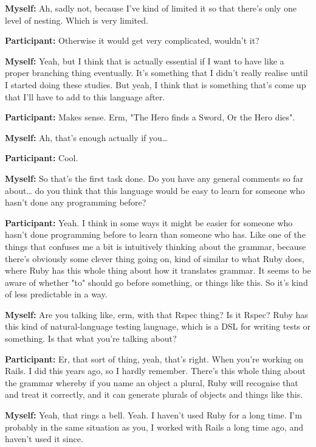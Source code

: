 \documentclass[11pt]{report}
\begin{document}
\begin{linenumbers}
\textbf{Myself:} Ah, sadly not, because I've kind of limited it so that there's only one level of nesting. Which is very limited.

\textbf{Participant:} Otherwise it would get very complicated, wouldn't it?

\textbf{Myself:} Yeah, but I think that is actually essential if I want to have like a proper branching thing eventually. It's something that I didn't really realise until I started doing these studies. But yeah, I think that is something that's come up that I'll have to add to this language after.

\textbf{Participant:} Makes sense. Erm, "The Hero finds a Sword, Or the Hero dies".

\textbf{Myself:} Ah, that's enough actually if you\ldots{}

\textbf{Participant:} Cool.

\textbf{Myself:} So that's the first task done. Do you have any general comments so far about\ldots{} do you think that this language would be easy to learn for someone who hasn't done any programming before?

\textbf{Participant:} Yeah. I think in some ways it might be easier for someone
who hasn't done programming before to learn than someone who has. Like one of
the things that confuses me a bit is intuitively thinking about the grammar,
because there's obviously some clever thing going on, kind of similar to what
Ruby does, where Ruby has this whole thing about how it translates grammar. It
seems to be aware of whether "to" should go before something, or things like
this. So it's kind of less predictable in a way.

\textbf{Myself:} Are you talking like, erm, with that Rspec thing? Is it Rspec? Ruby has this kind of natural-language testing language, which is a DSL for writing tests or something. Is that what you're talking about?

\textbf{Participant:} Er, that sort of thing, yeah, that's right. When you're working on Rails. I did this years ago, so I hardly remember. There's this whole thing about the grammar whereby if you name an object a plural, Ruby will recognise that and treat it correctly, and it can generate plurals of objects and things like this.

\textbf{Myself:} Yeah, that rings a bell. Yeah. I haven't used Ruby for a long time. I'm probably in the same situation as you, I worked with Rails a long time ago, and haven't used it since.


\end{linenumbers}
\end{document}
